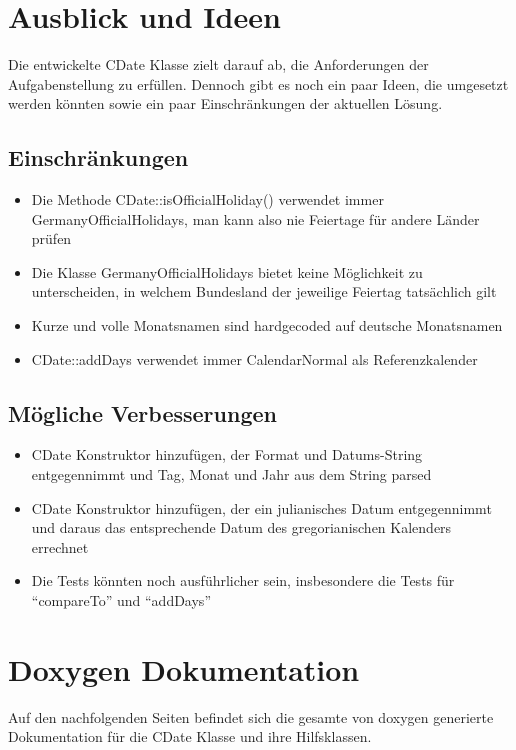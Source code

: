 \documentclass[12pt,pdftex,parskip=half]{scrartcl}
\begin{document}
  \clearpage



\section{Ausblick und Ideen}

Die entwickelte CDate Klasse zielt darauf ab, die Anforderungen der Aufgabenstellung zu erfüllen.
Dennoch gibt es noch ein paar Ideen, die umgesetzt werden könnten sowie ein paar Einschränkungen der aktuellen Lösung.

  \subsection{Einschränkungen}

    \begin{itemize}
      \item Die Methode CDate::isOfficialHoliday() verwendet immer GermanyOfficialHolidays, man kann also nie Feiertage für andere Länder prüfen
      \item Die Klasse GermanyOfficialHolidays bietet keine Möglichkeit zu unterscheiden, in welchem Bundesland der jeweilige Feiertag tatsächlich gilt
      \item Kurze und volle Monatsnamen sind hardgecoded auf deutsche Monatsnamen
      \item CDate::addDays verwendet immer CalendarNormal als Referenzkalender
    \end{itemize}


  \subsection{Mögliche Verbesserungen}

    \begin{itemize}
      \item CDate Konstruktor hinzufügen, der Format und Datums-String entgegennimmt und Tag, Monat und Jahr aus dem String parsed
      \item CDate Konstruktor hinzufügen, der ein julianisches Datum entgegennimmt und daraus das entsprechende Datum des gregorianischen Kalenders errechnet
      \item Die Tests könnten noch ausführlicher sein, insbesondere die Tests für "`compareTo"' und "`addDays"'
    \end{itemize}

  \clearpage


\section{Doxygen Dokumentation}

Auf den nachfolgenden Seiten befindet sich die gesamte von doxygen generierte Dokumentation für die CDate Klasse und ihre Hilfsklassen.

  
\end{document}
